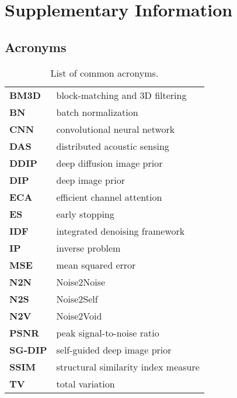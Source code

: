 \chapter{Supplementary Information}

\section{Acronyms}

\begin{table}[h!]
    \centering
    \begin{tabular}{ l l }
        \toprule
        \textbf{BM3D} & block-matching and 3D filtering \\
        \textbf{BN} & batch normalization \\
        \textbf{CNN} & convolutional neural network \\
        \textbf{DAS} & distributed acoustic sensing \\
        \textbf{DDIP} & deep diffusion image prior \\
        \textbf{DIP} & deep image prior \\
        \textbf{ECA} & efficient channel attention \\
        \textbf{ES} & early stopping \\
        \textbf{IDF} & integrated denoising framework \\
        \textbf{IP} & inverse problem \\
        \textbf{MSE} & mean squared error \\
        \textbf{N2N} & Noise2Noise \\
        \textbf{N2S} & Noise2Self \\
        \textbf{N2V} & Noise2Void \\
        \textbf{PSNR} & peak signal-to-noise ratio \\
        \textbf{SG-DIP} & self-guided deep image prior \\
        \textbf{SSIM} & structural similarity index measure \\
        \textbf{TV} & total variation \\
        \bottomrule
    \end{tabular}
    \caption{List of common acronyms.}
\end{table}

